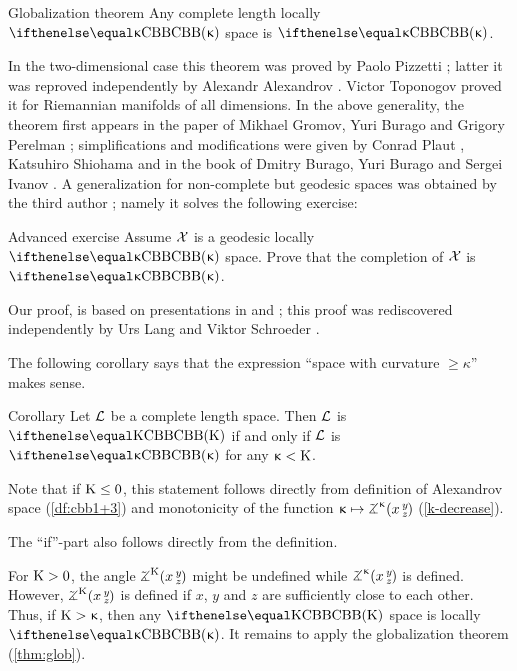 \begin{thm}{Globalization theorem}\label{thm:glob} 
Any complete length locally $\Alex\kappa$ space is $\Alex\kappa$.
\end{thm}

In the two-dimensional case this theorem was proved by Paolo Pizzetti \cite{pizzetti};
latter it was reproved independently by Alexandr Alexandrov \cite{alexandrov:devel}.%
Victor Toponogov \cite{toponogov-globalization+splitting} proved it for Riemannian manifolds of all dimensions.
In the above generality, the theorem first appears in the paper of Mikhael Gromov, Yuri Burago and Grigory Perelman \cite{burago-gromov-perelman}; 
simplifications and modifications were given by Conrad Plaut \cite{plaut:dimension}, Katsuhiro Shiohama \cite{shiohama} and in the book of Dmitry Burago, Yuri Burago and Sergei Ivanov \cite{burago-burago-ivanov}.
A generalization for non-complete but geodesic spaces was obtained by the third author \cite{petrunin:globalization}; namely it solves the following exercise: 

\begin{thm}{Advanced exercise}\label{ex:noncomplete-globalization}
Assume $\mathcal{X}$ is a geodesic locally  $\Alex\kappa$ space. 
Prove that the completion of $\mathcal{X}$ is $\Alex\kappa$.
\end{thm}

Our proof, is based on presentations in \cite{plaut:dimension} and \cite{burago-burago-ivanov};
this proof was rediscovered independently by Urs Lang and Viktor Schroeder \cite{lang-schroeder:globalization}.

The following corollary says that the expression ``space with curvature $\ge \kappa$'' makes sense.

\begin{thm}{Corollary}\label{cor:CAT>k-sence}
Let $\mathcal{L}$ be a complete length space.
Then $\mathcal{L}$ is $\Alex\Kappa$ if and only if $\mathcal{L}$ is $\Alex\kappa$ for any $\upkappa<\mathrm{K}$.
\end{thm}

Note that if $\Kappa\le 0$, this statement follows directly from definition of Alexandrov space (\ref{df:cbb1+3}) and monotonicity of the function $\kappa\mapsto\angk\kappa x y z$ (\ref{k-decrease}).

The ``if''-part also follows directly from the definition.

For $\mathrm{K}>0$, the angle $\angk{\Kappa} x y z$ might be undefined while $\angk{\kappa} x y z$ is defined.
However, $\angk{\Kappa} x y z$ is defined if $x$, $y$ and $z$ are sufficiently close to each other.
Thus, if $\mathrm{K}>\upkappa$, then any $\Alex\Kappa$ space is locally $\Alex\kappa$.
It remains to apply the  globalization theorem (\ref{thm:glob}).
\qeds

